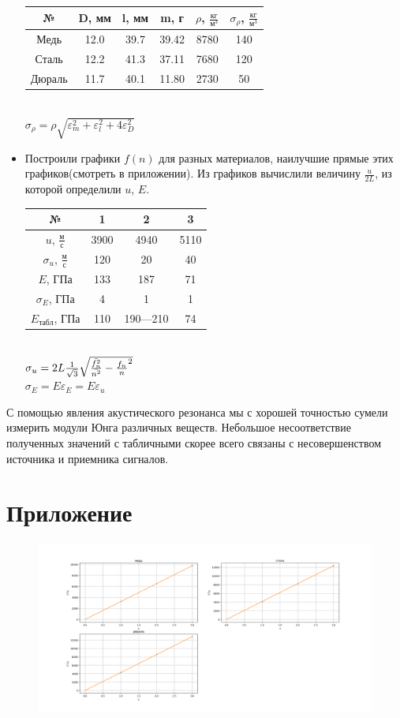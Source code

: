 \documentclass[a4paper, 12pt]{article}
\begin{document}
\begin{itemize}
\begin{table}[h!]
        \centering
        \begin{tabular}{|c|cccc|c|}
        \hline
        №& D, мм& l, мм& m, г& $\rho$, $\frac{кг}{м^3}$& $\sigma_{\rho}$, $\frac{кг}{м^3}$\\
        \hline
        Медь& 12.0& 39.7& 39.42& 8780& 140\\
        Сталь& 12.2& 41.3& 37.11& 7680& 120\\
        Дюраль& 11.7& 40.1& 11.80& 2730& 50\\
        \hline
        \end{tabular}
    \end{table}\\
    $\sigma_{\rho}=\rho\sqrt{\varepsilon_{m}^2+\varepsilon_{l}^2+4\varepsilon_{D}^2}$\\
    \item Построили графики $f(n)$ для разных материалов, наилучшие прямые этих графиков(смотреть в приложении). Из графиков вычислили величину $\frac{u}{2L}$, из которой определили $u$, $E$.\\
    \begin{table}[h]
        \centering
        \begin{tabular}{|c|ccc|}
        \hline
        №& 1& 2& 3\\
        \hline
        $u$, $\frac{м}{с}$&3900& 4940& 5110\\
        $\sigma_u$, $\frac{м}{с}$& 120& 20& 40\\
        $E$, $ГПа$& 133& 187&   71\\
        $\sigma_E$, $ГПа$& 4& 1& 1\\
        $E_{табл}$, $ГПа$& 110& 190—210&   74\\
        \hline
        \end{tabular}
    \end{table}\\
    $\sigma_u=2L\frac{1}{\sqrt{3}}\sqrt{\frac{\Bar{f_n^2}}{\Bar{n^2}}-\frac{f_n}{n}^2}$\\
    $\sigma_{E}=E\varepsilon_E=E\varepsilon_u$\\
\end{itemize}
С помощью явления акустического резонанса мы с хорошей точностью сумели измерить модули Юнга различных веществ. Небольшое несоответствие полученных значений с табличными скорее всего связаны с несовершенством источника и приемника сигналов.\newpage
\section*{Приложение}
\begin{figure}[h]
    \includegraphics[width=530pt]{image/full.png}
\end{figure}
\end{document}
